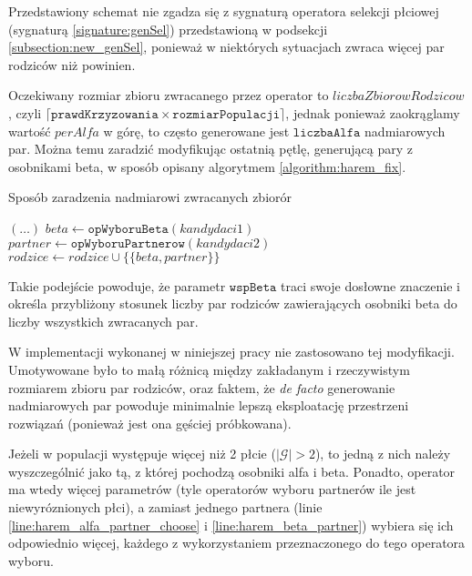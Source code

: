 \documentclass[twoside]{iisthesis}
\newcommand{\defacto}{\emph{de facto }}
\newcommand{\important}[1]{\mathcal{#1}}
\newcommand{\param}[1]{\mathtt{#1}}
\begin{document}
Przedstawiony schemat nie zgadza się z sygnaturą operatora selekcji płciowej (sygnaturą \ref{signature:genSel}) przedstawioną w podsekcji \ref{subsection:new_genSel}, ponieważ w niektórych sytuacjach zwraca więcej par rodziców niż powinien. 

Oczekiwany rozmiar zbioru zwracanego przez operator to $liczbaZbiorowRodzicow$, czyli $\lceil \param{prawdKrzyzowania} \times \param{rozmiarPopulacji} \rceil$, jednak ponieważ zaokrąglamy wartość $perAlfa$ w górę, to często generowane jest $\param{liczbaAlfa}$ nadmiarowych par.
Można temu zaradzić modyfikując ostatnią pętlę, generującą pary z osobnikami beta, w sposób opisany algorytmem \ref{algorithm:harem_fix}.

\begin{algorithm}
	\caption{Sposób zaradzenia nadmiarowi zwracanych zbiorór \label{algorithm:harem_fix}}
	\begin{algorithmic}[1]
		\Start
			\State $(\dots)$
			\setcounter{ALG@line}{14}
				\Var $beta \gets \param{opWyboruBeta}(kandydaci1)$
				\Var $partner \gets \param{opWyboruPartnerow}(kandydaci2)$
				\State $rodzice \gets rodzice \cup \{ \{ beta, partner \} \}$
			\EndWhile
			\State {}
		\EndOperator
	\end{algorithmic}
\end{algorithm}

Takie podejście powoduje, że parametr $\param{wspBeta}$ traci swoje dosłowne znaczenie i określa przybliżony stosunek liczby par rodziców zawierających osobniki beta do liczby wszystkich zwracanych par.

W implementacji wykonanej w niniejszej pracy nie zastosowano tej modyfikacji.
Umotywowane było to małą różnicą między zakładanym i rzeczywistym rozmiarem zbioru par rodziców, oraz faktem, że \defacto generowanie nadmiarowych par powoduje minimalnie lepszą eksploatację przestrzeni rozwiązań (ponieważ jest ona gęściej próbkowana).

Jeżeli w populacji występuje więcej niż 2 płcie ($|\important{G}| > 2$), to jedną z nich należy wyszczególnić jako tą, z której pochodzą osobniki alfa i beta. 
Ponadto, operator ma wtedy więcej parametrów (tyle operatorów wyboru partnerów ile jest niewyróznionych płci), a zamiast jednego partnera (linie \ref{line:harem_alfa_partner_choose} i \ref{line:harem_beta_partner}) wybiera się ich odpowiednio więcej, każdego z wykorzystaniem przeznaczonego do tego operatora wyboru.
\end{document}
